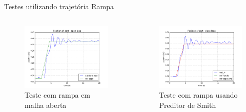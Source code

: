 \documentclass[10pt]{beamer}
\begin{document}
\begin{frame}[fragile]{Testes utilizando trajetória Rampa}
\begin{columns}[T]
\begin{column}{.5\textwidth}
\begin{figure}[!ht]
\centering
\includegraphics[width=1\textwidth]{figures/resultados/experimento/open_loop_ramp}
\caption{Teste com rampa em malha aberta}
\label{openLoopRamp}
\end{figure}
\end{column}

\begin{column}{.5\textwidth}
\begin{figure}[!ht]
\centering
\includegraphics[width=1\textwidth]{figures/resultados/experimento/closed_loop_trajetoria_rampa}
\caption{Teste com rampa usando Preditor de Smith}
\label{closedLoopRamp}
\end{figure}
\end{column}
\end{columns}
\end{frame}
\end{document}
